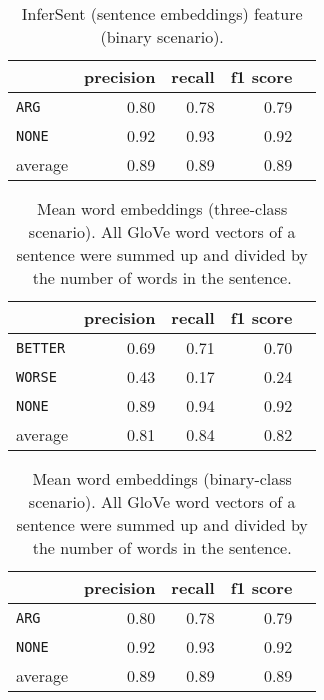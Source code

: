 \begin{table}[h] 
	\centering 
	\caption{InferSent (sentence embeddings) feature (binary scenario).} 
	\begin{tabular}{@{}lrrrr@{}}
		\toprule
		                & precision & recall & f1 score \\ \midrule 
		\texttt{ARG}    & 0.80      & 0.78   & 0.79     \\ 
		\texttt{NONE}   & 0.92      & 0.93   & 0.92     \\ 
		average         & 0.89      & 0.89   & 0.89     \\ 			\bottomrule
	\end{tabular}
\end{table}


\begin{table}[htbp] 
	\centering 
	\caption{Mean word embeddings (three-class scenario). All GloVe word vectors of a sentence were summed up and divided by the number of words in the sentence.} 
	\begin{tabular}{@{}lrrrr@{}}
		\toprule
		                & precision & recall & f1 score \\ \midrule 
		\texttt{BETTER} & 0.69      & 0.71   & 0.70     \\ 
		\texttt{WORSE}  & 0.43      & 0.17   & 0.24     \\ 
		\texttt{NONE}   & 0.89      & 0.94   & 0.92     \\ 
		average         & 0.81      & 0.84   & 0.82     \\ 			\bottomrule
	\end{tabular}
\end{table}

\begin{table}[h] 
	\centering 
	\caption{Mean word embeddings (binary-class scenario). All GloVe word vectors of a sentence were summed up and divided by the number of words in the sentence.}
	\begin{tabular}{@{}lrrrr@{}}
		\toprule
		                & precision & recall & f1 score \\ \midrule 
		\texttt{ARG}    & 0.80      & 0.78   & 0.79     \\ 
		\texttt{NONE}   & 0.92      & 0.93   & 0.92     \\ 
		average         & 0.89      & 0.89   & 0.89     \\ 			\bottomrule
	\end{tabular}
\end{table}


